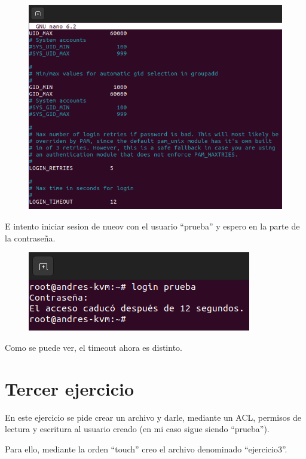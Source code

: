 \documentclass{article}
\begin{document}
\begin{figure}[H]
    \includegraphics[width=\textwidth]{imagenes/tout12.png}
\end{figure}

E intento iniciar sesion de nueov con el usuario ``prueba'' y espero en la parte de la contraseña.

\begin{figure}[H]
    \includegraphics[width=\textwidth]{imagenes/tout12login.png}
\end{figure}

Como se puede ver, el timeout ahora es distinto.


\section{Tercer ejercicio}
En este ejercicio se pide crear un archivo y darle, mediante un ACL, permisos de lectura y escritura al usuario creado (en mi caso sigue siendo ``prueba'').

Para ello, mediante la orden ``touch'' creo el archivo denominado ``ejercicio3''.
\end{document}
